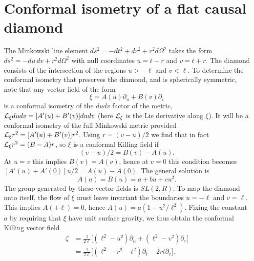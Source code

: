 \documentclass[aps,prd,twocolumn,showpacs,groupedaddress,nofootinbib,longbibliography]{revtex4-1}
\def\beq{\begin{equation}}
\def\eeq{\end{equation}}
\def\z{\zeta}
\def\k{\kappa}
\def\O{\Omega}
\def\L{{\cal L}}
\begin{document}
  

\section{Conformal isometry of a flat causal diamond}
\label{AppB}

The Minkowski line element $ds^2 = -dt^2 + dr^2 + r^2d\O^2$ takes the 
form $ds^2 = - du\, dv + r^2d\O^2$ with null coordinates $u=t-r$ and $v=t+r$. 
The diamond consists of the intersection of the regions $u>-\ell$ and $v<\ell$. 
To determine the conformal isometry that preserves the diamond, and is spherically symmetric, 
note that any vector field of the form 
%
\beq
\xi=A(u)\partial_u + B(v)\partial_v
\eeq
% 
is a conformal isometry of the $du dv$ factor of the metric,  $\L_\xi du dv = [A'(u) + B'(v)]dudv$ (here $\L_\xi$ is the Lie derivative along $\xi$). It will be a conformal isometry of the full Minkowski metric provided
$\L_\xi r^2 = [A'(u) + B'(v)] r^2$.  Using $r=(v-u)/2$ we find that in fact $\L_\xi r^2 = (B-A)r$, 
so $\xi$ is a conformal Killing field if 
%
\beq
[A'(u) + B'(v)] (v-u)/2 = B(v)-A(u).
\eeq
% 
At $u=v$ this implies $B(v)=A(v)$, hence at $v=0$ this condition becomes 
$[A'(u) + A'(0)] u/2 = A(u)-A(0)$. The general solution is 
%
\beq
A(u) = B(u) = a + bu + cu^2.
\eeq
% 
The group generated by these vector fields is $SL(2,R)$.
To map the diamond onto itself, the flow of $\xi$ must leave invariant the boundaries $u=-\ell$ 
and $v=\ell$. This implies $A(\pm\ell)=0$, hence $A(u) = a(1-u^2/\ell^2)$.
Fixing the constant $a$ by requiring that $\xi$ have unit surface gravity, we thus obtain
the conformal Killing vector field 
%
\begin{align}\label{zetauv}
\zeta &= \frac{1}{2\ell}\bigl[(\ell^2-u^2)\partial_u +(\ell^2-v^2)\partial_v\bigr]\\
&= \frac{1}{2\ell}\bigl[(\ell^2-r^2-t^2)\partial_t -2rt\partial_r\bigr].\label{zetatr}
\end{align}
% 
\end{document}
